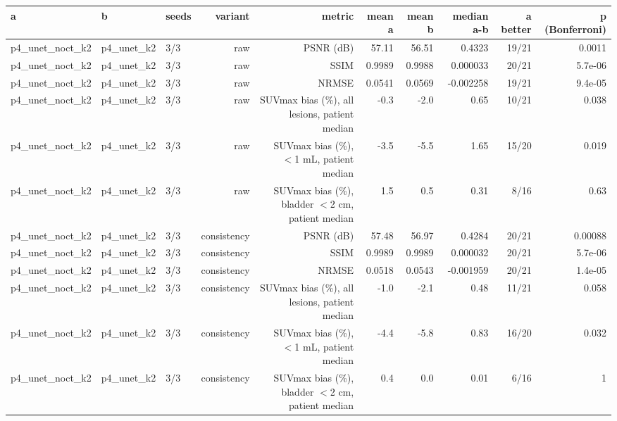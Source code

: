 \begin{tabular}{lllrrrrrrr}
\toprule
a & b & seeds & variant & metric & mean a & mean b & median a-b & a better & p (Bonferroni) \\
\midrule
p4\_unet\_noct\_k2 & p4\_unet\_k2 & 3/3 & raw & PSNR (dB) & 57.11 & 56.51 & 0.4323 & 19/21 & 0.0011 \\
p4\_unet\_noct\_k2 & p4\_unet\_k2 & 3/3 & raw & SSIM & 0.9989 & 0.9988 & 0.000033 & 20/21 & 5.7e-06 \\
p4\_unet\_noct\_k2 & p4\_unet\_k2 & 3/3 & raw & NRMSE & 0.0541 & 0.0569 & -0.002258 & 19/21 & 9.4e-05 \\
p4\_unet\_noct\_k2 & p4\_unet\_k2 & 3/3 & raw & SUVmax bias (\%), all lesions, patient median & -0.3 & -2.0 & 0.65 & 10/21 & 0.038 \\
p4\_unet\_noct\_k2 & p4\_unet\_k2 & 3/3 & raw & SUVmax bias (\%), $<$1 mL, patient median & -3.5 & -5.5 & 1.65 & 15/20 & 0.019 \\
p4\_unet\_noct\_k2 & p4\_unet\_k2 & 3/3 & raw & SUVmax bias (\%), bladder $<$2 cm, patient median & 1.5 & 0.5 & 0.31 & 8/16 & 0.63 \\
p4\_unet\_noct\_k2 & p4\_unet\_k2 & 3/3 & consistency & PSNR (dB) & 57.48 & 56.97 & 0.4284 & 20/21 & 0.00088 \\
p4\_unet\_noct\_k2 & p4\_unet\_k2 & 3/3 & consistency & SSIM & 0.9989 & 0.9989 & 0.000032 & 20/21 & 5.7e-06 \\
p4\_unet\_noct\_k2 & p4\_unet\_k2 & 3/3 & consistency & NRMSE & 0.0518 & 0.0543 & -0.001959 & 20/21 & 1.4e-05 \\
p4\_unet\_noct\_k2 & p4\_unet\_k2 & 3/3 & consistency & SUVmax bias (\%), all lesions, patient median & -1.0 & -2.1 & 0.48 & 11/21 & 0.058 \\
p4\_unet\_noct\_k2 & p4\_unet\_k2 & 3/3 & consistency & SUVmax bias (\%), $<$1 mL, patient median & -4.4 & -5.8 & 0.83 & 16/20 & 0.032 \\
p4\_unet\_noct\_k2 & p4\_unet\_k2 & 3/3 & consistency & SUVmax bias (\%), bladder $<$2 cm, patient median & 0.4 & 0.0 & 0.01 & 6/16 & 1 \\
\bottomrule
\end{tabular}
